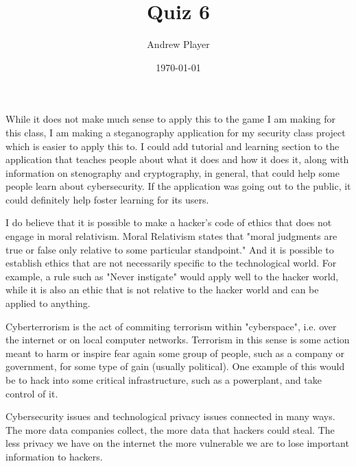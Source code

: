 \documentclass[12pt]{article}
\title{Quiz 6}
\author{Andrew Player}
\date{\today}
\makeatletter
\theoremstyle{homework}
\newenvironment{exercise}[1]
{\def\@currentlabel{#1}\exercisecore}
{\endexercisecore}
\makeatother
\begin{document}
\maketitle

\begin{exercise}{Question \# 1}
\end{exercise}
\noindent
While it does not make much sense to apply this to the game I am making for this class, I am
making a steganography application for my security class project which is easier to apply this to.
I could add tutorial and learning section to the application that teaches people about what it does
and how it does it, along with information on stenography and cryptography, in general, that could
help some people learn about cybersecurity. If the application was going out to the public, it could
definitely help foster learning for its users.


\begin{exercise}{Question \# 2}
\end{exercise}
\noindent
I do believe that it is possible to make a hacker's code of ethics that does not engage in 
moral relativism. Moral Relativism states that "moral judgments are true or false only relative
to some particular standpoint." And it is possible to establish ethics that are not necessarily
specific to the technological world. For example, a rule such as "Never instigate" would apply well 
to the hacker world, while it is also an ethic that is not relative to the hacker world and can be 
applied to anything.

\begin{exercise}{Question \# 3}
\end{exercise}
\noindent
Cyberterrorism is the act of commiting terrorism within "cyberspace", i.e. over the internet
or on local computer networks. Terrorism in this sense is some action meant to harm or inspire
fear again some group of people, such as a company or government, for some type of gain (usually political). 
One example of this would be to hack into some critical infrastructure, such as a powerplant, and take 
control of it. 
\newline 

\begin{exercise}{Question \# 4}
\end{exercise}
\noindent
Cybersecurity issues and technological privacy issues connected in many ways. The more data
companies collect, the more data that hackers could steal. The less privacy we have on the internet
the more vulnerable we are to lose important information to hackers. 
\end{document}
